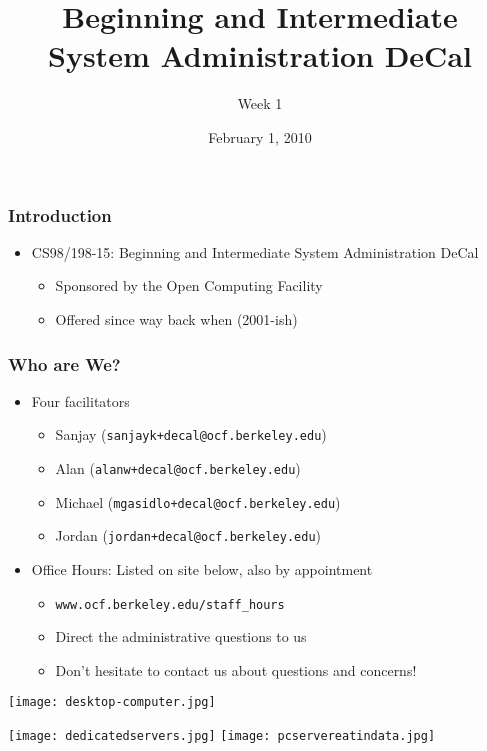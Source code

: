 \documentclass[14pt]{beamer}
\title{Beginning and Intermediate System Administration DeCal}
\author{Week 1}
\date{February 1, 2010}
\begin{document}
\begin{frame}
\maketitle
\end{frame}

\begin{frame}
	\frametitle{Introduction}
	\begin{itemize}
		\item CS98/198-15: Beginning and Intermediate System Administration DeCal
		\begin{itemize}
		  \item Sponsored by the Open Computing Facility 
		  \item Offered since way back when (2001-ish)
		\end{itemize} 
	\end{itemize}
\end{frame}

\begin{frame}
	\frametitle{Who are We?}
	\begin{itemize}
		\item Four facilitators
		\begin{itemize}
			\item Sanjay (\texttt{sanjayk+decal@ocf.berkeley.edu})
			\item Alan (\texttt{alanw+decal@ocf.berkeley.edu})
      \item Michael (\texttt{mgasidlo+decal@ocf.berkeley.edu})
			\item Jordan (\texttt{jordan+decal@ocf.berkeley.edu})
		\end{itemize}
		\item Office Hours: Listed on site below, also by appointment
		\begin{itemize}
			\item \texttt{www.ocf.berkeley.edu/staff\_hours}
			\item Direct the administrative questions to us
			\item Don't hesitate to contact us about questions and concerns!
		\end{itemize}
	\end{itemize}
\end{frame}

\begin{frame}
  \texttt{[image: desktop-computer.jpg]}
\end{frame}

\begin{frame}
  \texttt{[image: dedicatedservers.jpg]}
  \texttt{[image: pcservereatindata.jpg]}
\end{frame}
\end{document}
